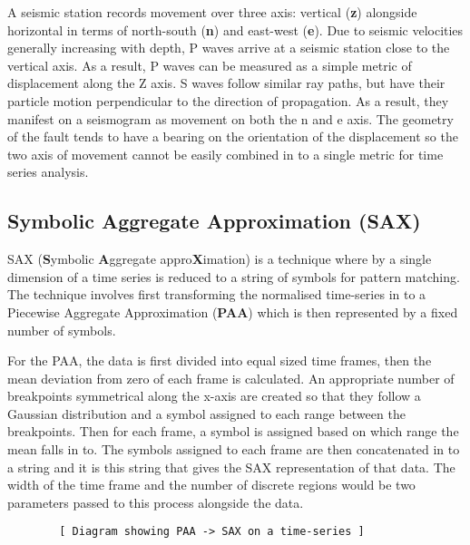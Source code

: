 \documentclass[11pt]{scrartcl}
\begin{document}
	A seismic station records movement over three axis: vertical (\textbf{z}) alongside horizontal in terms of north-south (\textbf{n}) and east-west (\textbf{e}).  Due to seismic velocities generally increasing with depth, P waves arrive at a seismic station close to the vertical axis.  As a result, P waves can be measured as a simple metric of displacement along the Z axis.  S waves follow similar ray paths, but have their particle motion perpendicular to the direction of propagation.  As a result, they manifest on a seismogram as movement on both the n and e axis. The geometry of the fault tends to have a bearing on the orientation of the displacement so the two axis of movement cannot be easily combined in to a single metric for time series analysis.
	
\subsection{Symbolic Aggregate Approximation (SAX)}
	SAX (\textbf{S}ymbolic \textbf{A}ggregate appro\textbf{X}imation) \citep{sax} is a technique where by a single dimension of a time series is reduced to a string of symbols for pattern matching.  The technique involves first transforming the normalised time-series in to a Piecewise Aggregate Approximation (\textbf{PAA}) which is then represented by a fixed number of symbols.
	
	For the PAA, the data is first divided into equal sized time frames, then the mean deviation from zero of each frame is calculated.  An appropriate number of breakpoints symmetrical along the x-axis are created so that they follow a Gaussian distribution and a symbol assigned to each range between the breakpoints.  Then for each frame, a symbol is assigned based on which range the mean falls in to.  The symbols assigned to each frame are then concatenated in to a string and it is this string that gives the SAX representation of that data.  The width of the time frame and the number of discrete regions would be two parameters passed to this process alongside the data.
	\begin{verbatim}
		[ Diagram showing PAA -> SAX on a time-series ]
	\end{verbatim}
	
\end{document}

